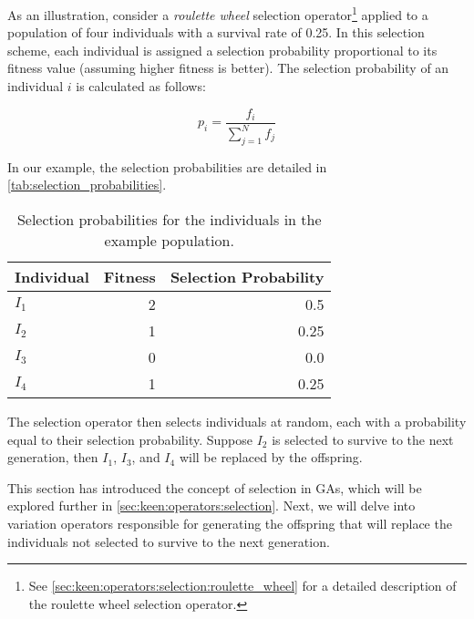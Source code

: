  As an illustration, consider a \textit{roulette wheel} selection operator\footnote{
    See \vref{sec:keen:operators:selection:roulette_wheel} for a detailed description of the 
    roulette wheel selection operator.
  } applied to a population of four individuals with a survival rate of 0.25.
  In this selection scheme, each individual is assigned a selection probability proportional to its 
  fitness value (assuming higher fitness is better).
  The selection probability of an individual \(i\) is calculated as follows:

  \begin{equation}
    \label{eq:selection_probability}
    p_i = \frac{f_i}{\sum_{j=1}^{N}f_j}
  \end{equation}

  In our example, the selection probabilities are detailed in \vref{tab:selection_probabilities}.

  \begin{table}[ht!]
    \centering
    \begin{tabular}{|l|r|r|}
      \hline
      Individual  & Fitness & Selection Probability \\
      \hline
      \(I_1\)     & 2       & 0.5  \\
      \(I_2\)     & 1       & 0.25   \\
      \(I_3\)     & 0       & 0.0   \\
      \(I_4\)     & 1       & 0.25  \\
      \hline
    \end{tabular}
    \caption{Selection probabilities for the individuals in the example population.}
    \label{tab:selection_probabilities}
  \end{table}

  The selection operator then selects individuals at random, each with a probability equal to their 
  selection probability. 
  Suppose \(I_2\) is selected to survive to the next generation, then \(I_1\), \(I_3\), and \(I_4\) 
  will be replaced by the offspring.

  This section has introduced the concept of selection in GAs, which will be explored further in 
  \vref{sec:keen:operators:selection}. 
  Next, we will delve into variation operators responsible for generating the offspring that will 
  replace the individuals not selected to survive to the next generation.
%